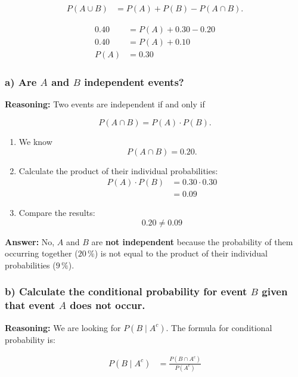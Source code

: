\documentclass[10pt]{article}
\begin{document}
\begin{align*}
P(A \cup B)
&= P(A)+P(B)-P(A \cap B).
\end{align*}

\begin{align*}
0.40
&= P(A)+0.30-0.20 \\[2mm]
0.40
&= P(A)+0.10 \\[2mm]
P(A)
&= 0.30
\end{align*}

\RepeatedQuestion{\uppgiftOneQuestion}
\subsubsection*{a) Are $A$ and $B$ independent events?}
\textbf{Reasoning:}
Two events are independent if and only if

\[
P(A \cap B)=P(A)\cdot P(B).
\]

\begin{enumerate}
\item We know
\[
P(A \cap B)=0.20.
\]

\item Calculate the product of their individual probabilities:
\begin{align*}
P(A)\cdot P(B)
&= 0.30 \cdot 0.30 \\[2mm]
&= 0.09
\end{align*}

\item Compare the results:
\[
0.20 \neq 0.09
\]
\end{enumerate}

\textbf{Answer:}
No, $A$ and $B$ are \textbf{not independent} because the
probability of them occurring together ($20\,\%$) is not equal
to the product of their individual probabilities ($9\,\%$).

\RepeatedQuestion{\uppgiftOneQuestion}
\subsubsection*{b) Calculate the conditional probability for event $B$ given that event $A$ does not occur.}
\textbf{Reasoning:}
We are looking for $P(B\mid A^c)$.
The formula for conditional probability is:

\begin{align*}
P(B\mid A^c)
&= \frac{P(B \cap A^c)}{P(A^c)}
\end{align*}
\end{document}

